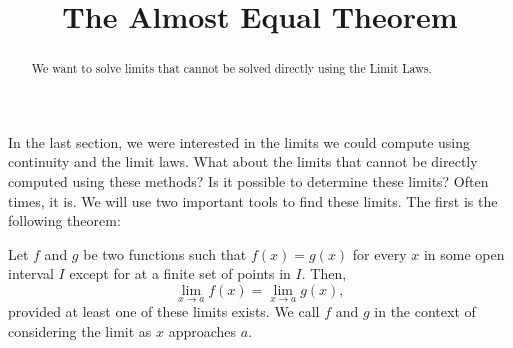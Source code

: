 \documentclass{ximera}
\title{The Almost Equal Theorem}
\begin{document}
\begin{abstract}
  We want to solve limits that cannot be solved directly using the
  Limit Laws.
\end{abstract}

\maketitle


In the last section, we were interested in the limits we could compute
using continuity and the limit laws. What about the limits that cannot
be directly computed using these methods?  Is it possible to determine
these limits?  Often times, it is.  We will use two important tools to
find these limits.  The first is the following theorem:

\begin{theorem}
Let $f$ and $g$ be two functions such that $f(x)=g(x)$ for every $x$
in some open interval $I$ except for at a finite set of points in $I$.
Then,
\[
\lim_{x\to a} f(x)= \lim_{x\to a} g(x),
\]
provided at least one of these limits exists.  We call $f$ and $g$
 in the context of considering the limit
as $x$ approaches $a$.
\end{theorem}
\end{document}
